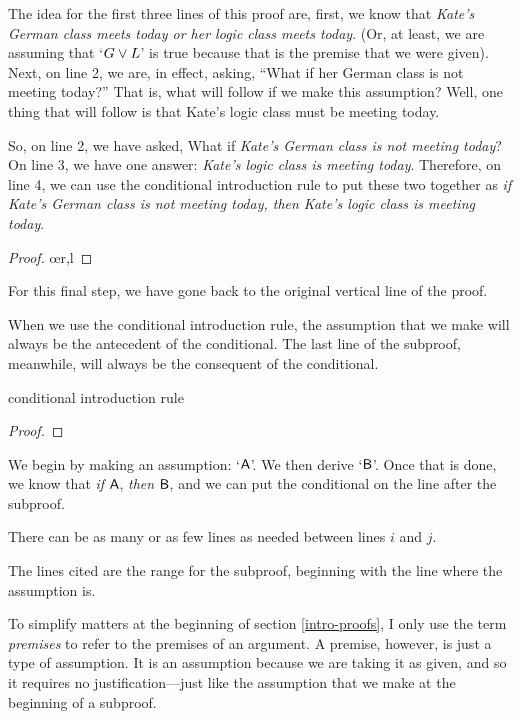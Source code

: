 The idea for the first three lines of this proof are, first, we know that \textit{Kate's German class meets today or her logic class meets today}. (Or, at least, we are assuming that `$ G \vee L$' is true because that is the premise that we were given). Next, on line 2, we are, in effect, asking, ``What if her German class is not meeting today?'' That is, what will follow if we make this assumption? Well, one thing that will follow is that Kate's logic class must be meeting today.  

So, on line 2, we have asked, What if \textit{Kate's German class is not meeting today}? On line 3, we have one answer: \textit{Kate's logic class is meeting today}. Therefore, on line 4, we can use the conditional introduction rule to put these two together as \textit{if Kate's German class is not meeting today, then Kate's logic class is meeting today}.
	\begin{proof}
		 \pr{}
		\open
			 \as{}
			\oe{r,l}
			\close
	\end{proof}
For this final step, we have gone back to the original vertical line of the proof. 

When we use the conditional introduction rule, the assumption that we make will always be the antecedent of the conditional. The last line of the subproof, meanwhile, will always be the consequent of the conditional.

\begin{factboxy}{conditional introduction rule}
	\begin{proof}
		\open
			 \as{}
		\close
	\end{proof}

\small{We begin by making an assumption: `$\mathsf{A}$'. We then derive `$\mathsf{B}$'. Once that is done, we know that \textit{if} $\mathsf{A}$, \textit{then} $\mathsf{B}$, and we can put the conditional on the line after the subproof.

There can be as many or as few lines as needed between lines $i$ and $j$.

The lines cited are the range for the subproof, beginning with the line where the assumption is.} 
\end{factboxy}


\begin{notebox}
To simplify matters at the beginning of section \ref{intro-proofs}, I only use the term \textit{premises} to refer to the premises of an argument. A premise, however, is just a type of assumption. It is an assumption because we are taking it as given, and so it requires no justification---just like the assumption that we make at the beginning of a subproof. 
\end{notebox}



